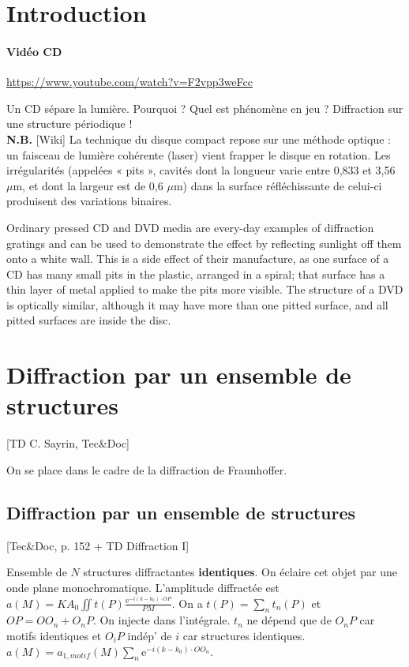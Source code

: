 \documentclass[11pt]{report}
\numberwithin{figure}{section}
\numberwithin{equation}{section}
\numberwithin{table}{section}
\newcommand{\e}{\mathrm{e}}
\newcommand{\1}{\boldsymbol{1}}
\begin{document}
\section*{Introduction}

\paragraph{Vidéo CD} \url{https://www.youtube.com/watch?v=F2vpp3weFcc}

Un CD sépare la lumière. Pourquoi ? Quel est phénomène en jeu ? Diffraction sur une structure périodique ! \\

\textbf{N.B.} [Wiki] La technique du disque compact repose sur une méthode optique : un faisceau de lumière cohérente (laser) vient frapper le disque en rotation. Les irrégularités (appelées « pits », cavités dont la longueur varie entre 0,833 et 3,56 $\mu$m, et dont la largeur est de 0,6 $\mu$m) dans la surface réfléchissante de celui-ci produisent des variations binaires.

Ordinary pressed CD and DVD media are every-day examples of diffraction gratings and can be used to demonstrate the effect by reflecting sunlight off them onto a white wall. This is a side effect of their manufacture, as one surface of a CD has many small pits in the plastic, arranged in a spiral; that surface has a thin layer of metal applied to make the pits more visible. The structure of a DVD is optically similar, although it may have more than one pitted surface, and all pitted surfaces are inside the disc.


\section{Diffraction par un ensemble de structures}

[TD C. Sayrin, Tec\&Doc]

On se place dans le cadre de la diffraction de Fraunhoffer.

\subsection{Diffraction par un ensemble de structures}

[Tec\&Doc, p. 152 + TD Diffraction I]

Ensemble de $N$ structures diffractantes \textbf{identiques}. On éclaire cet objet par une onde plane monochromatique. L'amplitude diffractée est $a(M) = K A_0 \iint t(P) \frac{\e^{-i (k-k_0) \cdot OP}}{PM}$. On a $t(P) = \sum_n t_n(P)$ et $OP = OO_n + O_nP$. On injecte dans l'intégrale. $t_n$ ne dépend que de $O_nP$ car motifs identiques et $O_iP$ indép' de $i$ car structures identiques.  $a(M) = a_{1,motif}(M) \sum_n \e^{-i (k-k_0) \cdot OO_n}$.
\end{document}

